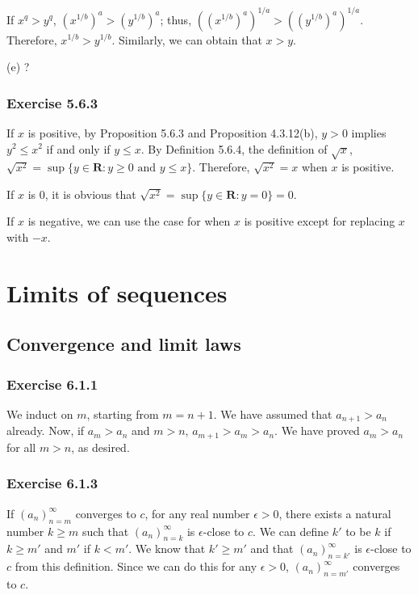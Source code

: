 \documentclass[12pt, oneside]{book}
\begin{document}
	If $x^q > y^q$, $(x^{1 / b})^a > (y^{1 / b})^a$; thus, $((x^{1 / b})^a)^{1 / a} > ((y^{1 / b})^a)^{1 / a}$. Therefore, $x^{1 / b} > y^{1 / b}$. Similarly, we can obtain that $x > y$.

	\bigskip
	\noindent (e) ?

	\subsection*{Exercise 5.6.3}

	If $x$ is positive, by Proposition 5.6.3 and Proposition 4.3.12(b), $y > 0$ implies $y^2 \le x^2$ if and only if $y \le x$. By Definition 5.6.4, the definition of $\sqrt{x}$, $\sqrt{x^2} = \sup \{y \in \mathbf{R}: y \ge 0 \text{ and } y \le x\}$. Therefore, $\sqrt{x^2} = x$ when $x$ is positive.

	If $x$ is $0$, it is obvious that $\sqrt{x^2} = \sup \{y \in \mathbf{R}: y = 0\} = 0$.

	If $x$ is negative, we can use the case for when $x$ is positive except for replacing $x$ with $-x$.

	\chapter{Limits of sequences}

	\section{Convergence and limit laws}

	\subsection*{Exercise 6.1.1}

	We induct on $m$, starting from $m = n + 1$. We have assumed that $a_{n + 1} > a_n$ already. Now, if $a_m > a_n$ and $m > n$, $a_{m + 1} > a_m > a_n$. We have proved $a_m > a_n$ for all $m > n$, as desired.

	\subsection*{Exercise 6.1.3}

	If $(a_n)_{n = m}^\infty$ converges to $c$, for any real number $\epsilon > 0$, there exists a natural number $k \ge m$ such that $(a_n)_{n = k}^\infty$ is $\epsilon$-close to $c$. We can define $k'$ to be $k$ if $k \ge m'$ and $m'$ if $k < m'$. We know that $k' \ge m'$ and that $(a_n)_{n = k'}^\infty$ is $\epsilon$-close to $c$ from this definition. Since we can do this for any $\epsilon > 0$, $(a_n)_{n = m'}^\infty$ converges to $c$.
\end{document}
